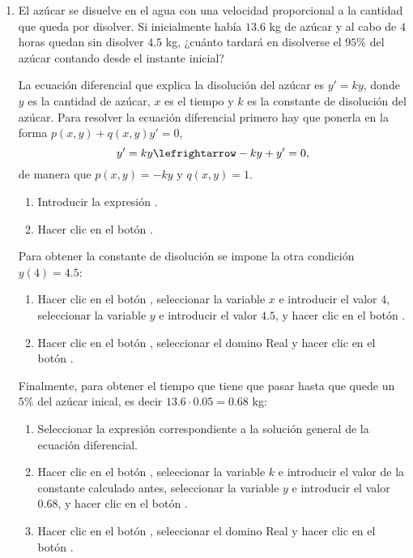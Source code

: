 \begin{enumerate}[leftmargin=*]
\item El azúcar se disuelve en el agua con una velocidad proporcional a la cantidad que queda por disolver. 
Si inicialmente había $13.6$ kg de azúcar y al cabo de $4$ horas quedan sin disolver $4.5$ kg, ¿cuánto tardará en
disolverse el $95\%$ del azúcar contando desde el instante inicial?

\begin{indicacion}
{La ecuación diferencial que explica la disolución del azúcar es $y'=ky$, donde $y$ es la cantidad de azúcar, $x$ es el
tiempo y $k$ es la constante de disolución del azúcar. 
Para resolver la ecuación diferencial primero hay que ponerla en la forma $p(x,y)+q(x,y)y'=0$,
\[
y'=ky \lefrightarrow -ky+y'=0,
\]
de manera que $p(x,y)=-ky$ y $q(x,y)=1$.
\begin{enumerate}
\item Introducir la expresión .
\item Hacer clic en el botón .
\end{enumerate}
Para obtener la constante de disolución se impone la otra condición $y(4)=4.5$:
\begin{enumerate}[resume]
\item Hacer clic en el botón , seleccionar la variable $x$ e introducir el valor $4$, seleccionar la
variable $y$ e introducir el valor $4.5$, y hacer clic en el botón .
\item Hacer clic en el botón , seleccionar el domino Real y hacer clic en el botón
.
\end{enumerate}
Finalmente, para obtener el tiempo que tiene que pasar hasta que quede un $5\%$ del azúcar inical, es decir $13.6\cdot
0.05=0.68$ kg:
\begin{enumerate}[resume]
\item Seleccionar la expresión correspondiente a la solución general de la ecuación diferencial.
\item Hacer clic en el botón , seleccionar la variable $k$ e introducir el valor de la constante
calculado antes, seleccionar la variable $y$ e introducir el valor $0.68$, y hacer clic en el botón .
\item Hacer clic en el botón , seleccionar el domino Real y hacer clic en el botón
.
\end{enumerate}
}
\end{indicacion}

\end{enumerate}


